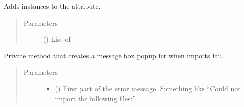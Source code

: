 \documentclass[letterpaper,10pt,english]{sphinxmanual}
\begin{document}
\begin{fulllineitems}
\begin{fulllineitems}
\label{\detokenize{polo.windows:polo.windows.run_importer.RunImporterDialog.RAW_INDEX}}
\end{fulllineitems}


\begin{fulllineitems}
\label{\detokenize{polo.windows:polo.windows.run_importer.RunImporterDialog._add_import_candidates}}
Adds {\hyperref[\detokenize{polo.windows:polo.windows.run_importer.ImportCandidate}]{}} instances to the 
 attribute.
\begin{quote}\begin{description}
\item[{Parameters}] \leavevmode
{} () \textendash{} List of 

\end{description}\end{quote}

\end{fulllineitems}


\begin{fulllineitems}
\label{\detokenize{polo.windows:polo.windows.run_importer.RunImporterDialog._could_not_import_message}}
Private method that creates a message box popup for when imports fail.
\begin{quote}\begin{description}
\item[{Parameters}] \leavevmode\begin{itemize}
\item {} 
 () \textendash{} First part of the error message. Something
like “Could not import the following files:”


\end{itemize}
\end{description}
\end{quote}
\end{fulllineitems}
\end{fulllineitems}
\end{document}
